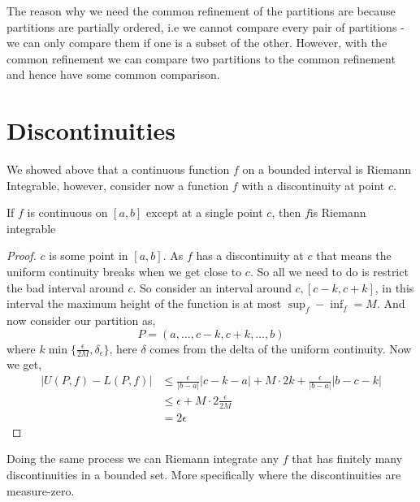 \begin{remark}
    The reason why we need the common refinement  of the partitions are because partitions are partially ordered, i.e we cannot compare every pair of partitions - we can only compare them if one is a subset of the other. However, with the common refinement we can compare two partitions to the common refinement and hence have some common comparison.
\end{remark}



\vspace{1em}
\section{Discontinuities} 
We showed above that a continuous function $f$ on a bounded interval is Riemann Integrable, however, consider now a function $f$ with a discontinuity at point $c$.
\begin{theorem}
    If $f$ is continuous on $[a, b]$ except at a single point $c$, then $f $is Riemann integrable 
\end{theorem}
\begin{proof}
    $c$ is some point in $[a, b]$. As $f$ has a discontinuity at $c$ that means the uniform continuity breaks when we get close to $c$. So all we need to do is restrict the bad interval around $c$. So consider an interval around $c, [c- k, c + k]$, in this interval the maximum height of the function is at most $\sup_f - \inf_f = M$. And now consider our partition as,
    \[
        P = (a, \dots, c - k, c + k, \dots, b)
    \] 
    where $k \min \{\frac{\epsilon}{2M}, \delta_{\epsilon}\}$, here $\delta$ comes from the delta of the uniform continuity. Now  we get, 
    \begin{align*}
        |U(P, f) - L(P, f)| &\le \frac{\epsilon}{|b - a|} |c - k - a| + M \cdot 2k +  \frac{\epsilon}{|b - a|} |b - c - k|\\
                            &\le \epsilon + M \cdot 2 \frac{\epsilon}{2M}\\
                            &= 2 \epsilon
    \end{align*}
\end{proof} 
\begin{note}
    Doing the same process we can Riemann integrate any $f$ that has finitely many discontinuities in a bounded set. More specifically where the discontinuities are measure-zero.
\end{note}


\vspace{1em}

